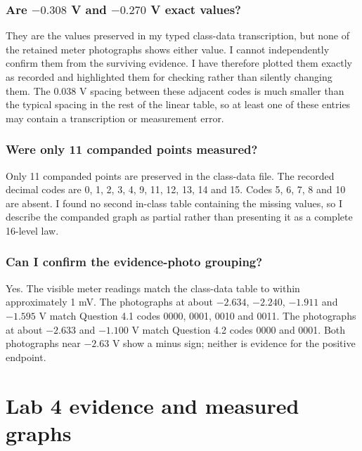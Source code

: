 \documentclass[11pt,a4paper]{article}
\begin{document}
\subsubsection*{Are $-0.308$ V and $-0.270$ V exact values?}
\begin{answerbox}
They are the values preserved in my typed class-data transcription, but none of the retained meter photographs shows either value. I cannot independently confirm them from the surviving evidence. I have therefore plotted them exactly as recorded and highlighted them for checking rather than silently changing them. The $0.038$ V spacing between these adjacent codes is much smaller than the typical spacing in the rest of the linear table, so at least one of these entries may contain a transcription or measurement error.
\end{answerbox}

\subsubsection*{Were only 11 companded points measured?}
\begin{answerbox}
Only 11 companded points are preserved in the class-data file. The recorded decimal codes are 0, 1, 2, 3, 4, 9, 11, 12, 13, 14 and 15. Codes 5, 6, 7, 8 and 10 are absent. I found no second in-class table containing the missing values, so I describe the companded graph as partial rather than presenting it as a complete 16-level law.
\end{answerbox}

\subsubsection*{Can I confirm the evidence-photo grouping?}
\begin{answerbox}
Yes. The visible meter readings match the class-data table to within approximately 1 mV. The photographs at about $-2.634$, $-2.240$, $-1.911$ and $-1.595$ V match Question 4.1 codes 0000, 0001, 0010 and 0011. The photographs at about $-2.633$ and $-1.100$ V match Question 4.2 codes 0000 and 0001. Both photographs near $-2.63$ V show a minus sign; neither is evidence for the positive endpoint.
\end{answerbox}

\section{Lab 4 evidence and measured graphs}
\end{document}
